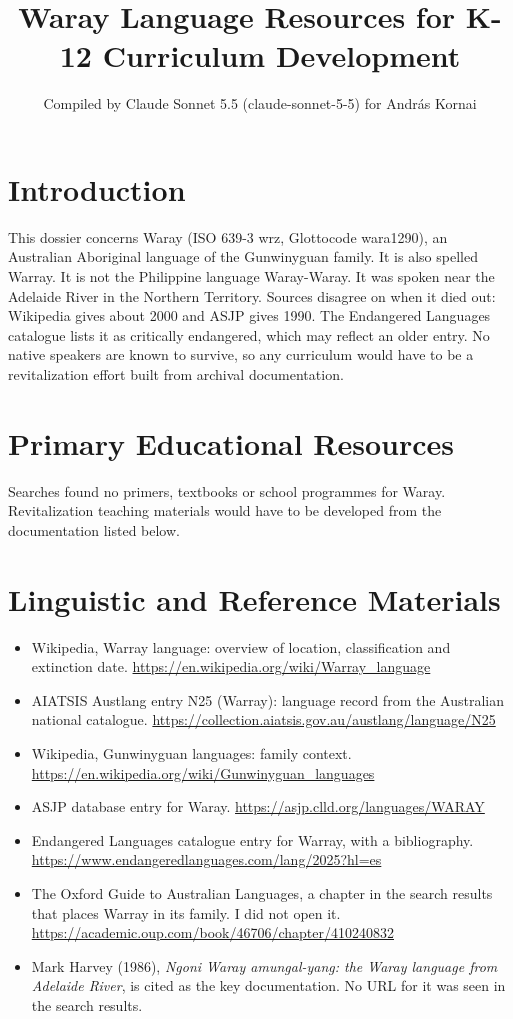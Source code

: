 \documentclass[12pt]{article}
\title{Waray Language Resources for K-12 Curriculum Development}
\author{Compiled by Claude Sonnet 5.5 (claude-sonnet-5-5) for Andr\'as Kornai}
\date{}
\begin{document}
\maketitle

\section{Introduction}
This dossier concerns Waray (ISO 639-3 wrz, Glottocode wara1290), an Australian Aboriginal language of the Gunwinyguan family. It is also spelled Warray. It is not the Philippine language Waray-Waray. It was spoken near the Adelaide River in the Northern Territory. Sources disagree on when it died out: Wikipedia gives about 2000 and ASJP gives 1990. The Endangered Languages catalogue lists it as critically endangered, which may reflect an older entry. No native speakers are known to survive, so any curriculum would have to be a revitalization effort built from archival documentation.

\section{Primary Educational Resources}
Searches found no primers, textbooks or school programmes for Waray. Revitalization teaching materials would have to be developed from the documentation listed below.

\section{Linguistic and Reference Materials}
\begin{itemize}
\item Wikipedia, Warray language: overview of location, classification and extinction date. \url{https://en.wikipedia.org/wiki/Warray_language}
\item AIATSIS Austlang entry N25 (Warray): language record from the Australian national catalogue. \url{https://collection.aiatsis.gov.au/austlang/language/N25}
\item Wikipedia, Gunwinyguan languages: family context. \url{https://en.wikipedia.org/wiki/Gunwinyguan_languages}
\item ASJP database entry for Waray. \url{https://asjp.clld.org/languages/WARAY}
\item Endangered Languages catalogue entry for Warray, with a bibliography. \url{https://www.endangeredlanguages.com/lang/2025?hl=es}
\item The Oxford Guide to Australian Languages, a chapter in the search results that places Warray in its family. I did not open it. \url{https://academic.oup.com/book/46706/chapter/410240832}
\item Mark Harvey (1986), \emph{Ngoni Waray amungal-yang: the Waray language from Adelaide River}, is cited as the key documentation. No URL for it was seen in the search results.
\end{itemize}
\end{document}
